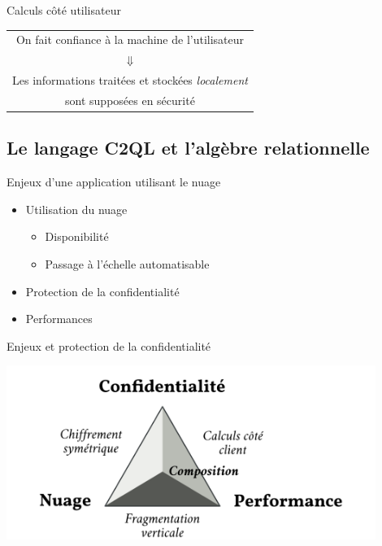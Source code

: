 \documentclass{beamer}
\begin{document}
\begin{frame}{Calculs côté utilisateur}
\begin{center}
\begin{tabular}{c}
On fait confiance à la machine de l'utilisateur \\
$\Downarrow$ \\
Les informations traitées et stockées \emph{localement} \\
sont supposées en sécurité
\end{tabular}
\end{center}
\end{frame}

\subsection{Le langage C2QL et l'algèbre relationnelle}
\begin{frame}{Enjeux d'une application utilisant le nuage}
\begin{itemize}
\item Utilisation du nuage
\begin{itemize}
\item Disponibilité
\item Passage à l'échelle automatisable
\end{itemize}
\item Protection de la confidentialité
\item Performances
\end{itemize}
\end{frame}

\begin{frame}{Enjeux et protection de la confidentialité}
\begin{center}
\hspace{0.7cm}
\includegraphics[width=0.9\textwidth]{snps.png}
\end{center}
\end{frame}
\end{document}
